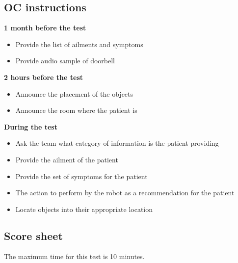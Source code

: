 \subsection{OC instructions}

\textbf{1 month before the test}
\begin{itemize}
\item Provide the list of ailments and symptoms
\item Provide audio sample of doorbell
\end{itemize}
\textbf{2 hours before the test}
\begin{itemize}
\item Announce the placement of the objects
\item Announce the room where the patient is
\end{itemize}
\textbf{During the test}
\begin{itemize}
\item Ask the team what category of information is the patient providing
\item Provide the ailment of the patient
\item Provide the set of symptoms for the patient
\item The action to perform by the robot as a recommendation for the patient
\item Locate objects into their appropriate location
\end{itemize}

\subsection{Score sheet}

The maximum time for this test is 10 minutes.

